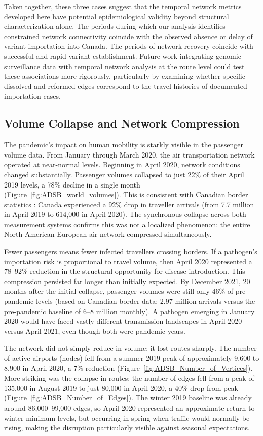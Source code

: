 \documentclass{elsarticle}
\begin{document}
Taken together, these three cases suggest that the temporal network metrics developed here have potential epidemiological validity beyond structural characterization alone. The periods during which our analysis identifies constrained network connectivity coincide with the observed absence or delay of variant importation into Canada. The periods of network recovery coincide with successful and rapid variant establishment. Future work integrating genomic surveillance data with temporal network analysis at the route level could test these associations more rigorously, particularly by examining whether specific dissolved and reformed edges correspond to the travel histories of documented importation cases.


\subsection{Volume Collapse and Network Compression}

The pandemic's impact on human mobility is starkly visible in the passenger volume data. From January through March 2020, the air transportation network operated at near-normal levels. Beginning in April 2020, network conditions changed substantially. Passenger volumes collapsed to just 22\% of their April 2019 levels, a 78\% decline in a single month (Figure~\ref{fig:ADSB_world_volumes}). This is consistent with Canadian border statistics \cite{StatisticsCanada_2026}: Canada experienced a 92\% drop in traveller arrivals (from 7.7 million in April 2019 to 614,000 in April 2020). The synchronous collapse across both measurement systems confirms this was not a localized phenomenon: the entire North American-European air network compressed simultaneously.

Fewer passengers means fewer infected travellers crossing borders. If a pathogen's importation risk is proportional to travel volume, then April 2020 represented a 78--92\% reduction in the structural opportunity for disease introduction. This compression persisted far longer than initially expected. By December 2021, 20 months after the initial collapse, passenger volumes were still only 46\% of pre-pandemic levels (based on Canadian border data: 2.97 million arrivals versus the pre-pandemic baseline of 6--8 million monthly). A pathogen emerging in January 2020 would have faced vastly different transmission landscapes in April 2020 versus April 2021, even though both were pandemic years.

The network did not simply reduce in volume; it lost routes sharply. The number of active airports (nodes) fell from a summer 2019 peak of approximately 9,600 to 8,900 in April 2020, a 7\% reduction (Figure~\ref{fig:ADSB_Number_of_Vertices}). More striking was the collapse in routes: the number of edges fell from a peak of 135,000 in August 2019 to just 80,000 in April 2020, a 40\% drop from peak (Figure~\ref{fig:ADSB_Number_of_Edges}). The winter 2019 baseline was already around 86,000--99,000 edges, so April 2020 represented an approximate return to winter minimum levels, but occurring in spring when traffic would normally be rising, making the disruption particularly visible against seasonal expectations.
\end{document}

